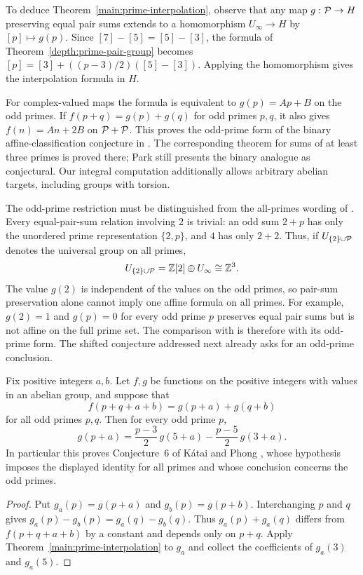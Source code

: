To deduce Theorem~\ref{main:prime-interpolation}, observe that any map
$g:\mathcal P\to H$ preserving equal pair sums extends to a homomorphism
$U_\infty\to H$ by $[p]\mapsto g(p)$. Since
$[7]-[5]=[5]-[3]$, the formula of Theorem~\ref{depth:prime-pair-group}
becomes $[p]=[3]+((p-3)/2)([5]-[3])$. Applying the homomorphism gives
the interpolation formula in $H$.

For complex-valued maps the formula is equivalent to $g(p)=Ap+B$
on the odd primes. If $f(p+q)=g(p)+g(q)$ for odd primes $p,q$, it
also gives $f(n)=An+2B$ on $\mathcal P+\mathcal P$. This proves the odd-prime
form of the binary affine-classification conjecture in
\cite[Conj.~1]{KP15}. The corresponding theorem for sums of at least
three primes is proved there; Park \cite[p.~6, after Thm.~3.7]{Park25}
still presents the binary analogue as conjectural. Our integral
computation additionally allows arbitrary abelian targets, including
groups with torsion.

The odd-prime restriction must be distinguished from the all-primes
wording of \cite[Conj.~1]{KP15}. Every equal-pair-sum relation involving
$2$ is trivial: an odd sum $2+p$ has only the unordered prime
representation $\{2,p\}$, and $4$ has only $2+2$.
Thus, if $U_{\{2\}\cup\mathcal P}$ denotes the universal group on all primes,
\[
 U_{\{2\}\cup\mathcal P}=\mathbb Z[2]\oplus U_\infty
                    \cong\mathbb Z^3.
\]
The value $g(2)$ is independent of the values on the odd primes, so
pair-sum preservation alone cannot imply one affine formula on all
primes. For example, $g(2)=1$ and $g(p)=0$ for every odd prime $p$
preserves equal pair sums but is not affine on the full prime set.
The comparison with \cite[Conj.~1]{KP15} is therefore with its
odd-prime form. The shifted conjecture addressed next already asks
for an odd-prime conclusion.

\begin{corollary}\label{depth:KP-interpolation}
Fix positive integers $a,b$. Let $f,g$ be functions on the positive
integers with values in an abelian group, and suppose that
\[
 f(p+q+a+b)=g(p+a)+g(q+b)
\]
for all odd primes $p,q$. Then for every odd prime $p$,
\[
 g(p+a)=\frac{p-3}{2}\,g(5+a)-\frac{p-5}{2}\,g(3+a).
\]
In particular this proves Conjecture~6 of K\'atai and Phong
\cite[p.~235]{KP15Problems}, whose hypothesis imposes the displayed
identity for all primes and whose conclusion concerns the odd primes.
\end{corollary}
\begin{proof}
Put $g_a(p)=g(p+a)$ and $g_b(p)=g(p+b)$. Interchanging $p$ and $q$ gives
$g_a(p)-g_b(p)=g_a(q)-g_b(q)$. Thus $g_a(p)+g_a(q)$ differs from $f(p+q+a+b)$
by a constant and depends only on $p+q$. Apply
Theorem~\ref{main:prime-interpolation} to $g_a$ and collect the
coefficients of $g_a(3)$ and $g_a(5)$.
\end{proof}

